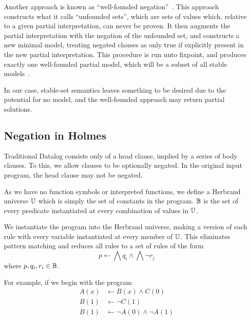 Another approach is known as ``well-founded negation''~\cite{wellfounded}.
This approach constructs what it calls ``unfounded sets'', which are sets of values which, relative to a given partial interpretation, can never be proven.
It then augments the partial interpretation with the negation of the unfounded set, and constructs a new minimal model, treating negated clauses as only true if explicitly present in the new partial interpretation.
This procedure is run unto fixpoint, and produces exactly one well-founded partial model, which will be a subset of all stable models~\cite{wellfounded}.

In our case, stable-set semantics leaves something to be desired due to the potential for no model, and the well-founded approach may return partial solutions.
\subsection{Negation in Holmes}
Traditional Datalog consists only of a head clause, implied by a series of body clauses.
To this, we allow clauses to be optionally negated.
In the original input program, the head clause may not be negated.

As we have no function symbols or interpreted functions, we define a Herbrand universe $\mathbb{U}$ which is simply the set of constants in the program.
$\mathbb{B}$ is the set of every predicate instantiated at every combination of values in $\mathbb{U}$.

We instantiate the program into the Herbrand universe, making a version of each rule with every variable instantiated at every member of $\mathbb{U}$.
This eliminates pattern matching and reduces all rules to a set of rules of the form
\[
	p \leftarrow \bigwedge q_i \wedge \bigwedge \neg r_j
\]
where $p, q_i, r_i \in \mathbb{B}$.

For example, if we begin with the program
\begin{align*}
A(x) &\leftarrow B(x) \wedge C(0)\\
B(1) &\leftarrow \neg C(1)\\
B(1) &\leftarrow \neg A(0) \wedge \neg A(1)
\end{align*}

